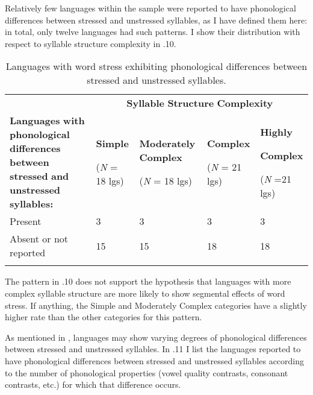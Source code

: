   Relatively few languages within the sample were reported to have phonological differences between stressed and unstressed syllables, as I have defined them here: in total, only twelve languages had such patterns. I show their distribution with respect to syllable structure complexity in .10.






\begin{table}
\begin{tabularx}{\textwidth}{XXXXX}
\lsptoprule
 & \multicolumn{4}{c}{ \textbf{Syllable} \textbf{Structure} \textbf{Complexity}}\\
 \textbf{Languages} \textbf{with} \textbf{phonological} \textbf{differences} \textbf{between} \textbf{stressed} \textbf{and} \textbf{unstressed} \textbf{syllables:} & { \textbf{Simple}}

 (\textit{N} = 18 lgs) & { \textbf{Moderately} \textbf{Complex}}

 (\textit{N} = 18 lgs) & { \textbf{Complex}}

 (\textit{N} = 21 lgs) & { \textbf{Highly} }

{ \textbf{Complex}}

 (\textit{N} =21 lgs)\\
 Present & 3 & 3 & 3 & 3\\
 Absent or not reported & 15 & 15 & 18 & 18\\
\lspbottomrule
\end{tabularx}
\caption{\label{5.10}Languages with word stress exhibiting phonological differences between stressed and unstressed syllables.}
\end{table}




  The pattern in .10 does not support the hypothesis that languages with more complex syllable structure are more likely to show segmental effects of word stress. If anything, the Simple and Moderately Complex categories have a slightly higher rate than the other categories for this pattern.



  As mentioned in , languages may show varying degrees of phonological differences between stressed and unstressed syllables. In .11 I list the languages reported to have phonological differences between stressed and unstressed syllables according to the number of phonological properties (vowel quality contrasts, consonant contrasts, etc.) for which that difference occurs.






